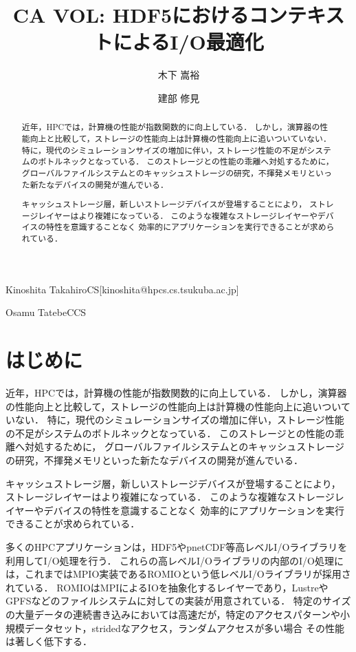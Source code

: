 \documentclass[submit,techrep,noauthor]{ipsj}
\begin{document}

\title{CA VOL: HDF5におけるコンテキストによるI/O最適化}

\author{木下 嵩裕}{Kinoshita Takahiro}{CS}[kinoshita@hpcs.cs.tsukuba.ac.jp]
\author{建部 修見}{Osamu Tatebe}{CCS}

\begin{abstract}
	近年，HPCでは，計算機の性能が指数関数的に向上している．
	しかし，演算器の性能向上と比較して，ストレージの性能向上は計算機の性能向上に追いついていない．
	特に，現代のシミュレーションサイズの増加に伴い，ストレージ性能の不足がシステムのボトルネックとなっている．
	このストレージとの性能の乖離へ対処するために，
	グローバルファイルシステムとのキャッシュストレージの研究，不揮発メモリといった新たなデバイスの開発が進んでいる．
	
	キャッシュストレージ層，新しいストレージデバイスが登場することにより，
	ストレージレイヤーはより複雑になっている．
	このような複雑なストレージレイヤーやデバイスの特性を意識することなく
	効率的にアプリケーションを実行できることが求められている．
\end{abstract}

\maketitle

\section{はじめに}
近年，HPCでは，計算機の性能が指数関数的に向上している．
しかし，演算器の性能向上と比較して，ストレージの性能向上は計算機の性能向上に追いついていない．
特に，現代のシミュレーションサイズの増加に伴い，ストレージ性能の不足がシステムのボトルネックとなっている．
このストレージとの性能の乖離へ対処するために，
グローバルファイルシステムとのキャッシュストレージの研究，不揮発メモリといった新たなデバイスの開発が進んでいる．

キャッシュストレージ層，新しいストレージデバイスが登場することにより，
ストレージレイヤーはより複雑になっている．
このような複雑なストレージレイヤーやデバイスの特性を意識することなく
効率的にアプリケーションを実行できることが求められている．

多くのHPCアプリケーションは，HDF5やpnetCDF等高レベルI/Oライブラリを利用してI/O処理を行う．
これらの高レベルI/Oライブラリの内部のI/O処理には，これまではMPIO実装であるROMIOという低レベルI/Oライブラリが採用されている．
ROMIOはMPIによるIOを抽象化するレイヤーであり，LustreやGPFSなどのファイルシステムに対しての実装が用意されている．
特定のサイズの大量データの連続書き込みにおいては高速だが，特定のアクセスパターンや小規模データセット，stridedなアクセス，ランダムアクセスが多い場合
その性能は著しく低下する．
\end{document}
